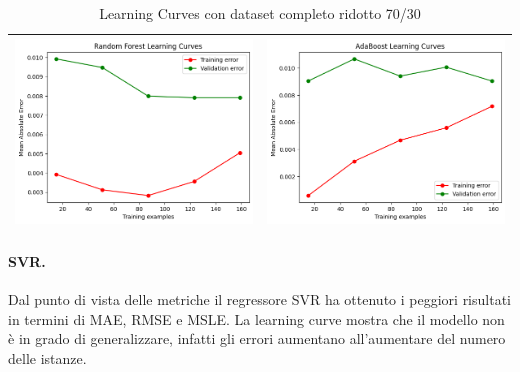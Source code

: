 \begin{table}[H]
\begin{tabularx}{\textwidth}{|X|X|}
        \includegraphics[width=\linewidth, trim=0 0 0 0]{images/RandomForest_lc70_ridotto.png} &
        \includegraphics[width=\linewidth, trim=0 0 0 0]{images/AdaBoost_lc70_ridotto.png} \\
        \hline
    \end{tabularx}
    \caption{Learning Curves con dataset completo ridotto 70/30}
    \label{tab:emissions_info}
\end{table}

\paragraph{\textbf{SVR}.}
Dal punto di vista delle metriche il regressore SVR ha ottenuto i peggiori risultati in termini di MAE, RMSE e MSLE. La learning curve mostra che il modello non è in grado di generalizzare, infatti gli errori aumentano all'aumentare del numero delle istanze.

